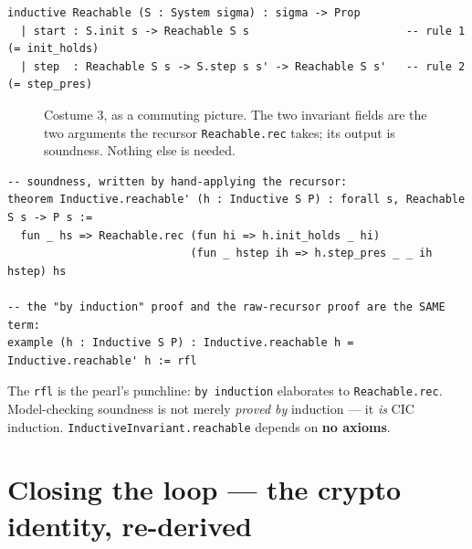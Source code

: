 \documentclass[runningheads]{llncs}
\begin{document}
\begin{lstlisting}[style=lean]
inductive Reachable (S : System sigma) : sigma -> Prop
  | start : S.init s -> Reachable S s                        -- rule 1  (= init_holds)
  | step  : Reachable S s -> S.step s s' -> Reachable S s'   -- rule 2  (= step_pres)
\end{lstlisting}

\begin{figure}[H]
\centering
{}
\caption{Costume 3, as a commuting picture. The two invariant fields are the two
arguments the recursor \lstinline[style=lean]|Reachable.rec| takes; its output is
soundness. Nothing else is needed.}
\label{fig:recursor}
\end{figure}

\begin{lstlisting}[style=lean]
-- soundness, written by hand-applying the recursor:
theorem Inductive.reachable' (h : Inductive S P) : forall s, Reachable S s -> P s :=
  fun _ hs => Reachable.rec (fun hi => h.init_holds _ hi)
                            (fun _ hstep ih => h.step_pres _ _ ih hstep) hs

-- the "by induction" proof and the raw-recursor proof are the SAME term:
example (h : Inductive S P) : Inductive.reachable h = Inductive.reachable' h := rfl
\end{lstlisting}

\begin{artifact}
\small\centering
The \lstinline[style=lean]|rfl| is the pearl's punchline: \texttt{by induction}
elaborates to \texttt{Reachable.rec}. Model-checking soundness is not merely
\emph{proved by} induction --- it \emph{is} CIC induction.
\lstinline[style=lean]|InductiveInvariant.reachable| depends on \textbf{no axioms}.
\end{artifact}

\section{Closing the loop --- the crypto identity, re-derived}
\end{document}
